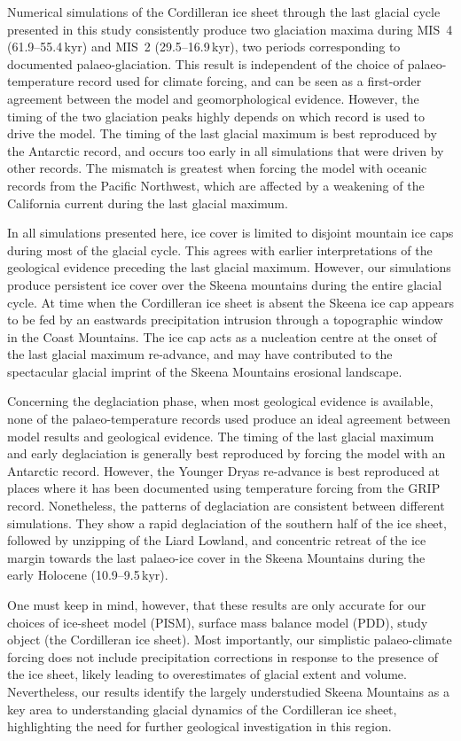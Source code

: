 \documentclass[tc, ms]{copernicus}
\begin{document}
Numerical simulations of the Cordilleran ice sheet through the last glacial
cycle presented in this study consistently produce two glaciation maxima during
MIS~4 (61.9--55.4\,\unit{kyr}) and MIS~2 (29.5--16.9\,\unit{kyr}), two periods
corresponding to documented palaeo-glaciation. This result is independent
of the choice of palaeo-temperature record used for climate forcing, and
can be seen as a first-order agreement between the model and geomorphological
evidence. However, the timing of the two glaciation peaks highly depends on
which record
is used to drive the model. The timing of the last glacial maximum is best
reproduced by the Antarctic record, and occurs too early in all simulations
that were driven by other records. The mismatch is greatest when forcing the
model with oceanic records from the Pacific Northwest, which are affected by a
weakening of the California current during the last glacial maximum.

In all simulations presented here, ice cover is limited to disjoint mountain ice
caps during most of the glacial cycle. This agrees with earlier interpretations
of the geological evidence preceding the last glacial maximum. However, our
simulations produce persistent ice cover over the Skeena mountains during
the entire glacial cycle. At time when the Cordilleran ice sheet is absent
the Skeena ice cap appears to be fed by an eastwards precipitation
intrusion through a topographic window in the Coast Mountains. The ice cap acts
as a nucleation centre at the onset of the last glacial maximum re-advance, and
may have contributed to the spectacular glacial imprint of the Skeena Mountains
erosional landscape.

Concerning the deglaciation phase, when most geological evidence is available,
none of the palaeo-temperature records used produce an ideal agreement between
model results and geological evidence. The
timing of the last glacial maximum and early deglaciation is generally best
reproduced by forcing the model with an Antarctic
record. However, the Younger Dryas re-advance is best reproduced at places
where it has been documented using temperature forcing from the GRIP record.
Nonetheless, the patterns of deglaciation are consistent between different
simulations. They show a rapid deglaciation of the southern half of the ice
sheet, followed by unzipping of the Liard Lowland, and concentric retreat of
the ice margin towards the last palaeo-ice cover in the Skeena Mountains
during the early Holocene (10.9--9.5\,\unit{kyr}).

One must keep in mind, however, that these results are only accurate for our
choices of ice-sheet model (PISM), surface mass balance model (PDD), study
object (the Cordilleran ice sheet). Most importantly, our simplistic
palaeo-climate forcing does not include precipitation corrections in response
to the presence of the ice sheet, likely leading to overestimates of glacial
extent and volume. Nevertheless, our results identify the largely understudied
Skeena Mountains as a key area to understanding glacial dynamics of the
Cordilleran ice sheet, highlighting the need for further geological
investigation in this region.
\end{document}
